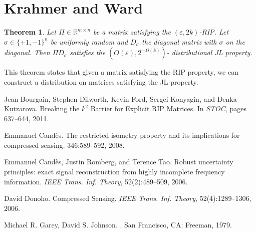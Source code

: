 \documentclass[11pt]{article}
\newcommand{\eps}{\varepsilon}
\newcommand{\R}{\mathbb{R}}
\newtheorem{theorem}{Theorem}
\begin{document}


\section{Krahmer and Ward}

\begin{theorem}
	Let $\Pi \in \R^{m \times n}$ be a matrix satisfying the $(\eps, 2k)$-RIP.
	Let $\sigma \in \{+1,-1\}^n$ be uniformly random and $D_\sigma$ the 
	diagonal matrix with $\sigma$ on the diagonal.
	Then $\Pi D_\sigma$ satisfies the $(O(\eps), 2^{-\Omega(k)})$-
	distributional JL property.
\end{theorem}

This theorem states that given a matrix satisfying the RIP property, we can 
construct a distribution on matrices satisfying the JL property.







\begin{thebibliography}{42}

Jean Bourgain, Stephen Dilworth, Kevin Ford, Sergei Konyagin, and Denka Kutzarova.
\newblock Breaking the $k^2$ Barrier for Explicit RIP Matrices.
\newblock In \emph{STOC}, pages 637--644, 2011.

Emmanuel Cand\`{e}s.
\newblock The restricted isometry property and its implications for compressed sensing.
 346:589--592, 2008.

Emmanuel Cand\`{e}s, Justin Romberg, and Terence Tao.
\newblock Robust uncertainty principles: exact signal reconstruction from highly incomplete frequency information.
\newblock \emph{IEEE Trans. Inf. Theory}, 52(2):489--509, 2006.

David Donoho.
\newblock Compressed Sensing.
\newblock \emph{IEEE Trans. Inf. Theory}, 52(4):1289--1306, 2006.

Michael R. Garey, David S. Johnson.
.
\newblock San Francisco, CA: Freeman, 1979.

\end{thebibliography}
\end{document}
